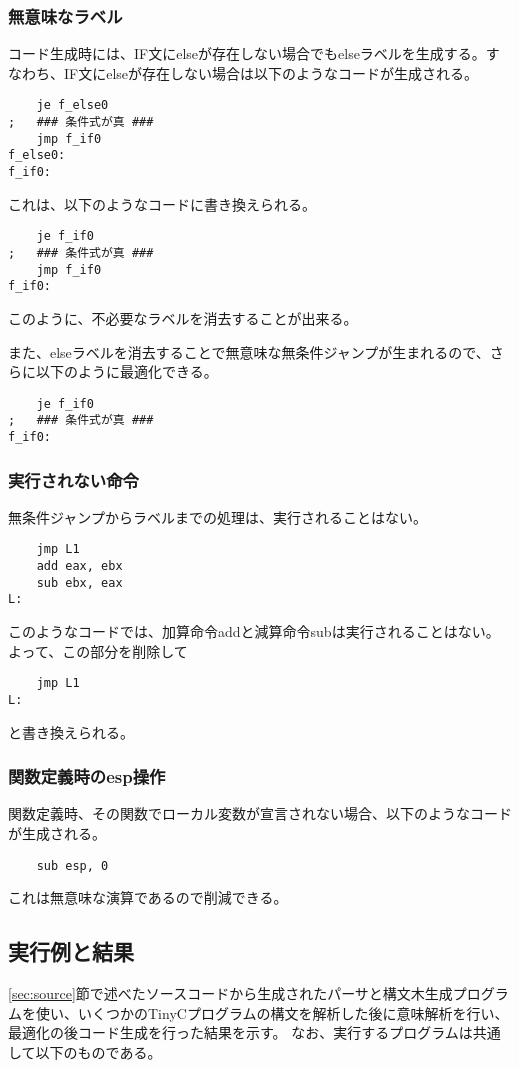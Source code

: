 \documentclass[titlepage, a4paper,12pt]{jarticle}
\begin{document}
\subsubsection{無意味なラベル}
コード生成時には、IF文にelseが存在しない場合でもelseラベルを生成する。すなわち、IF文にelseが存在しない場合は以下のようなコードが生成される。
\begin{verbatim}
    je f_else0
;   ### 条件式が真 ###
    jmp f_if0
f_else0:
f_if0:
\end{verbatim}
これは、以下のようなコードに書き換えられる。
\begin{verbatim}
    je f_if0
;   ### 条件式が真 ###
    jmp f_if0
f_if0:
\end{verbatim}
このように、不必要なラベルを消去することが出来る。

また、elseラベルを消去することで無意味な無条件ジャンプが生まれるので、さらに以下のように最適化できる。
\begin{verbatim}
    je f_if0
;   ### 条件式が真 ###
f_if0:
\end{verbatim}
\subsubsection{実行されない命令}
無条件ジャンプからラベルまでの処理は、実行されることはない。
\begin{verbatim}
    jmp L1
    add eax, ebx
    sub ebx, eax
L:
\end{verbatim}
このようなコードでは、加算命令addと減算命令subは実行されることはない。よって、この部分を削除して
\begin{verbatim}
    jmp L1
L:
\end{verbatim}
と書き換えられる。
\subsubsection{関数定義時のesp操作}
関数定義時、その関数でローカル変数が宣言されない場合、以下のようなコードが生成される。
\begin{verbatim}
    sub esp, 0
\end{verbatim}
これは無意味な演算であるので削減できる。
\subsection{実行例と結果}
\ref{sec:source}節で述べたソースコードから生成されたパーサと構文木生成プログラムを使い、いくつかのTinyCプログラムの構文を解析した後に意味解析を行い、最適化の後コード生成を行った結果を示す。
なお、実行するプログラムは共通して以下のものである。
\end{document}
